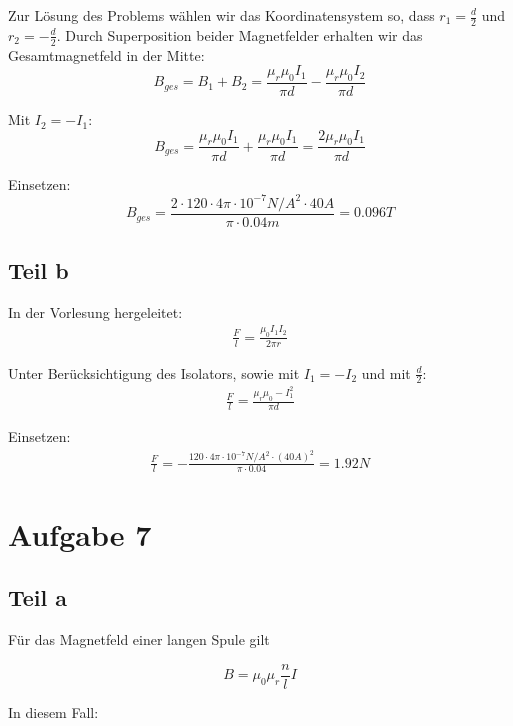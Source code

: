 \documentclass[a4paper,german,12pt,smallheadings]{scrartcl}
\begin{document}
Zur Lösung des Problems wählen wir das Koordinatensystem so, dass $r_1=\frac{d}{2}$ und $r_2=-\frac{d}{2}$. Durch Superposition beider Magnetfelder erhalten wir das Gesamtmagnetfeld in der Mitte:
\begin{equation*}
B_{ges}=B_1+B_2= \frac{\mu_r \mu_0 I_1}{\pi d}- \frac{\mu_r \mu_0 I_2}{\pi d}
\end{equation*}

Mit $I_2=-I_1$:
\begin{equation*}
B_{ges}=\frac{\mu_r \mu_0 I_1}{\pi d}+ \frac{\mu_r \mu_0 I_1}{\pi d}=\frac{2\mu_r \mu_0 I_1}{\pi d}
\end{equation*}

Einsetzen:
\begin{equation*}
B_{ges}=\frac{2\cdot 120 \cdot 4\pi \cdot 10^{-7} N/A^2 \cdot 40A}{\pi \cdot 0.04m} =0.096T
\end{equation*}

\subsection*{Teil b}

In der Vorlesung hergeleitet:
\begin{align*}
\frac{F}{l}=\frac{\mu_0 I_1 I_2}{2 \pi r}
\end{align*}

Unter Berücksichtigung des Isolators, sowie mit $I_1=-I_2$ und  mit $\frac{d}{2}$:
\begin{align*}
\frac{F}{l}=\frac{\mu_r \mu_0 -I_1^2}{\pi d}
\end{align*}

Einsetzen:
\begin{align*}
\frac{F}{l}=-\frac{120 \cdot 4\pi \cdot 10^{-7}N/A^2 \cdot (40A)^2}{\pi \cdot 0.04}=1.92N
\end{align*}

\section*{Aufgabe 7}
\subsection*{Teil a}
Für das Magnetfeld einer langen Spule gilt

\begin{equation}
  B = \mu_0 \mu_r \frac{n}{l} I
\end{equation}

In diesem Fall:
\end{document}
